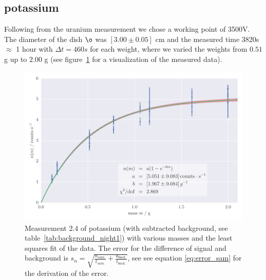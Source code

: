 \subsection{potassium}
\label{subsec:potassium}
Following from the uranium measurement we chose a working point of 3500V. The diameter 
of the dish $\o$ was $\left [ 3.00 \pm 0.05 \right ]$ cm and the measured time 3820s $\approx$ 1 hour with
$\Delta t = 460s$ for each weight, where we varied the weights from $0.51$ g up to $2.00$ g (see figure~\ref{fig:2_4_potassium} 
for a visualization of the measured data).
\begin{figure}[H]
    \centering
    \includegraphics[width=\linewidth]{analysis/figures/measurement_2_4}
    \caption{Measurement 2.4 of potassium (with subtracted background, see table~\ref{tab:background_night1}) with various masses
    and the least squares fit of the data. The error for the difference
    of signal and background is $s_n = \sqrt{\frac{n_{sam.}}{t_{sam.}}+\frac{u_{back.}}{t_{back.}} }$, see see equation \eqref{eq:error_sam} for
    the derivation of the error.}
    \label{fig:2_4_potassium}
\end{figure}
